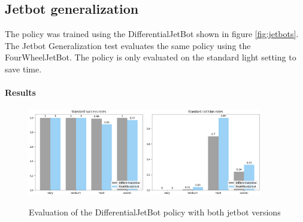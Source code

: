 

\subsection{Jetbot generalization}

The policy was trained using the DifferentialJetBot shown in figure \ref{fig:jetbots}. The Jetbot Generalization test evaluates the same policy using the FourWheelJetBot. The policy is only evaluated on the standard light setting to save time.

\paragraph{Results}

\begin{figure}
    \centering
    \includegraphics[width=0.45\textwidth]{Bilder/notebook_images/hardDistanceMixedLight_eval_jetbot_generalization_success_rates_barplot.png}
    \includegraphics[width=0.45\textwidth]{Bilder/notebook_images/hardDistanceMixedLight_eval_jetbot_generalization_collision_rates_barplot.png}
    \caption{Evaluation of the DifferentialJetBot policy with both jetbot versions}
    \label{fig:result_jetbot_generalization}
\end{figure} %

